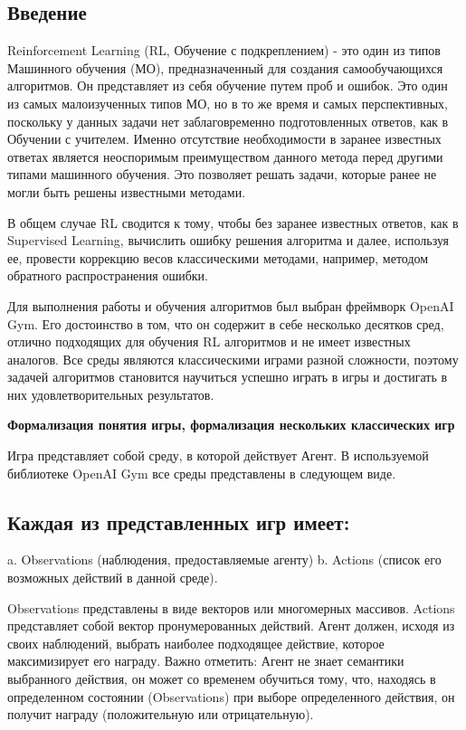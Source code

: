 \subsection*{Введение}

Reinforcement Learning (RL, Обучение с подкреплением) - это один из типов Машинного обучения (МО), предназначенный для создания самообучающихся алгоритмов. Он представляет из себя обучение путем проб и ошибок. Это один из самых малоизученных типов МО, но в то же время и самых перспективных, поскольку у данных задачи нет заблаговременно подготовленных ответов, как в Обучении с учителем. Именно отсутствие необходимости в заранее известных ответах является неоспоримым преимуществом данного метода перед другими типами машинного обучения. Это позволяет решать задачи, которые ранее не могли быть решены известными методами.

В общем случае RL сводится к тому, чтобы без заранее известных ответов, как в Supervised Learning, вычислить ошибку решения алгоритма и далее, используя ее, провести коррекцию весов классическими методами, например, методом обратного распространения ошибки.

Для выполнения работы и обучения алгоритмов был выбран фреймворк OpenAI Gym. Его достоинство в том, что он содержит в себе несколько десятков сред, отлично подходящих для обучения RL алгоритмов и не имеет известных аналогов. Все среды являются классическими играми разной сложности, поэтому задачей алгоритмов становится научиться успешно играть в игры и достигать в них удовлетворительных результатов.

\textbf{Формализация понятия игры, формализация нескольких классических игр}

Игра представляет собой среду, в которой действует Агент. В используемой библиотеке OpenAI Gym все среды представлены в следующем виде.

\subsection*{Каждая из представленных игр имеет:}

a. Observations (наблюдения, предоставляемые агенту)
b. Actions (список его возможных действий в данной среде).
 
Observations представлены в виде векторов или многомерных массивов. Actions представляет собой вектор пронумерованных действий. Агент должен, исходя из своих наблюдений, выбрать наиболее подходящее действие, которое максимизирует его награду. Важно отметить: Агент не знает семантики выбранного действия, он может со временем обучиться тому, что, находясь в определенном состоянии (Observations) при выборе определенного действия, он получит награду (положительную или отрицательную).

